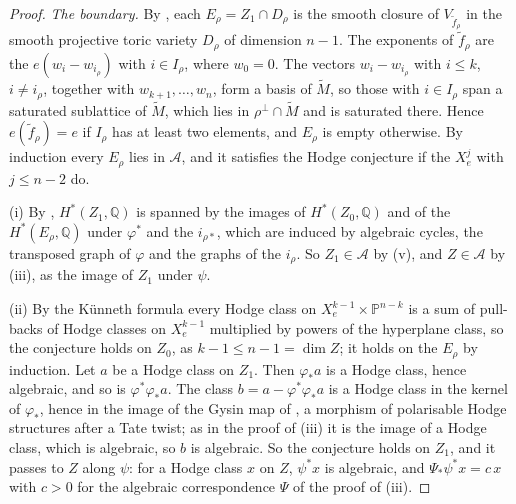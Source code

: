 \documentclass[11pt,reqno]{amsart}
\theoremstyle{plain}
\theoremstyle{definition}
\theoremstyle{remark}
\newcommand{\QQ}{\mathbb{Q}}
\newcommand{\PP}{\mathbb{P}}
\begin{document}
\begin{proof}
\emph{The boundary.} By , each $E_{\rho}=Z_{1}\cap
D_{\rho}$ is the smooth closure of $V_{\widetilde f_{\rho}}$ in the smooth
projective toric variety $D_{\rho}$ of dimension $n-1$. The exponents of
$\widetilde f_{\rho}$ are the $e(w_{i}-w_{i_{\rho}})$ with $i\in I_{\rho}$,
where $w_{0}=0$. The vectors $w_{i}-w_{i_{\rho}}$ with $i\le k$,
$i\ne i_{\rho}$, together with $w_{k+1},\dots,w_{n}$, form a basis of
$\widetilde M$, so those with $i\in I_{\rho}$ span a saturated sublattice of
$\widetilde M$, which lies in $\rho^{\perp}\cap\widetilde M$ and is
saturated there. Hence $e(\widetilde f_{\rho})=e$ if $I_{\rho}$ has at least
two elements, and $E_{\rho}$ is empty otherwise. By induction every
$E_{\rho}$ lies in $\mathcal{A}$, and it satisfies the Hodge conjecture if
the $X^{j}_{e}$ with $j\le n-2$ do.

(i) By , $H^{*}(Z_{1},\QQ)$ is spanned by the images of
$H^{*}(Z_{0},\QQ)$ and of the $H^{*}(E_{\rho},\QQ)$ under $\varphi^{*}$ and
the $i_{\rho*}$, which are induced by algebraic cycles, the transposed
graph of $\varphi$ and the graphs of the $i_{\rho}$. So
$Z_{1}\in\mathcal{A}$ by (v), and $Z\in\mathcal{A}$ by
(iii), as the image of $Z_{1}$ under $\psi$.

(ii) By the K\"unneth formula every Hodge class on $X^{k-1}_{e}\times
\PP^{n-k}$ is a sum of pull-backs of Hodge classes on $X^{k-1}_{e}$
multiplied by powers of the hyperplane class, so the conjecture holds on
$Z_{0}$, as $k-1\le n-1=\dim Z$; it holds on the $E_{\rho}$ by induction.
Let $a$ be a Hodge class on $Z_{1}$. Then $\varphi_{*}a$ is a Hodge class,
hence algebraic, and so is $\varphi^{*}\varphi_{*}a$. The class
$b=a-\varphi^{*}\varphi_{*}a$ is a Hodge class in the kernel of
$\varphi_{*}$, hence in the image of the Gysin map of
, a morphism of polarisable Hodge structures after a
Tate twist; as in the proof of (iii) it is the image of a
Hodge class, which is algebraic, so $b$ is algebraic. So the conjecture
holds on $Z_{1}$, and it passes to $Z$ along $\psi$: for a Hodge class $x$
on $Z$, $\psi^{*}x$ is algebraic, and $\Psi_{*}\psi^{*}x=c\,x$ with $c>0$ for
the algebraic correspondence $\Psi$ of the proof of
(iii).
\end{proof}
\end{document}
